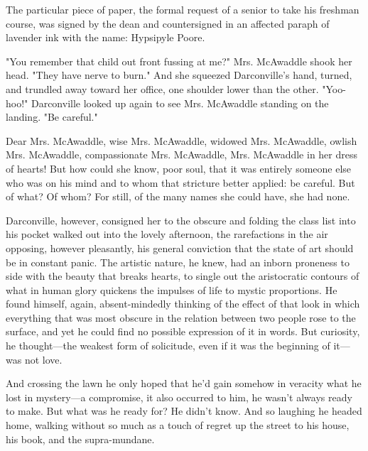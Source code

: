   The particular piece of paper, the formal request of a senior to take his
freshman course, was signed by the dean and countersigned in an affected paraph
of lavender ink with the name: Hypsipyle Poore.

  "You remember that child out front fussing at me?" Mrs. McAwaddle shook her
head. "They have nerve to burn." And she squeezed Darconville's hand, turned,
and trundled 
away toward her office, one shoulder lower than the other.
"Yoo-hoo!" Darconville looked up again to see Mrs. McAwaddle standing on the
landing. "Be careful."

  Dear Mrs. McAwaddle, wise Mrs. McAwaddle, widowed Mrs. McAwaddle, owlish Mrs.
McAwaddle, compassionate Mrs. McAwaddle, Mrs. McAwaddle in her dress of hearts!
But how could she know, poor soul, that it was entirely someone else who was on
his mind and to whom that stricture better applied: be careful. But of what? Of
whom? For still, of the many names she could have, she had none.

  Darconville, however, consigned 
her to the obscure and folding the class list
into his pocket walked out into the lovely afternoon, the rarefactions 
in the air opposing, however pleasantly, his general conviction that the state 
of art should be in constant panic. The artistic nature, he knew, had an inborn
proneness to side with the beauty that breaks hearts, to single out the
aristocratic contours of what in human glory quickens the impulses of life to
mystic proportions. He found himself, again, absent-mindedly thinking of the
effect of that look in which everything that was most obscure in the relation
between two people rose to the surface, and yet he could find no possible
expression of it in words. But curiosity, he thought---the weakest form of
solicitude, 
even if it was the beginning of it---was not love.

  And crossing the lawn he only hoped that he'd gain somehow in veracity 
what he
lost in mystery---a compromise, it also occurred to him, he wasn't always ready to
make. But what was he ready for? He didn't know. And so laughing he headed home,
walking without so much as a touch of regret up the street to his house, his
book, and the supra-mundane.
